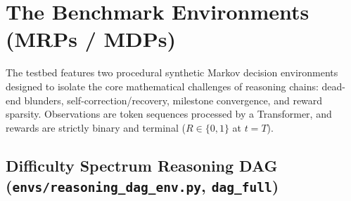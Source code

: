 \documentclass[11pt,a4paper]{article}
\begin{document}
\bigskip

\section{The Benchmark Environments (MRPs / MDPs)}

The testbed features two procedural synthetic Markov decision environments designed to isolate the core mathematical challenges of reasoning chains: dead-end blunders, self-correction/recovery, milestone convergence, and reward sparsity. Observations are token sequences processed by a Transformer, and rewards are strictly binary and terminal ($R \in \{0, 1\}$ at $t=T$).

\subsection{\texorpdfstring{Difficulty Spectrum Reasoning DAG (\texttt{envs/reasoning\_dag\_env.py}, \texttt{dag\_full})}{Difficulty Spectrum Reasoning DAG (dag\_full)}}
\end{document}
